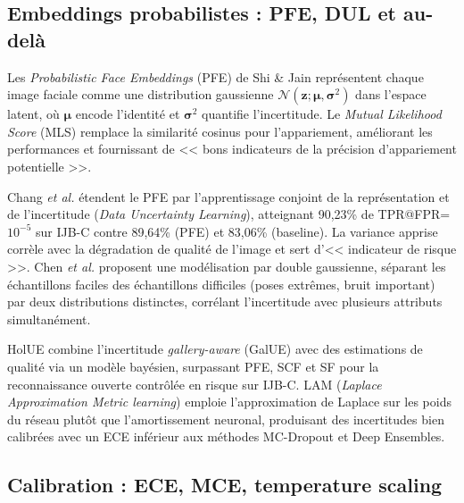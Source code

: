 \documentclass[12pt,a4paper]{report}
\begin{document}
\subsection{Embeddings probabilistes : PFE, DUL et au-del\`{a}}

Les \textit{Probabilistic Face Embeddings} (PFE) de Shi \& Jain \cite{shi2019pfe} repr\'{e}sentent chaque image faciale comme une distribution gaussienne $\mathcal{N}(\mathbf{z}; \boldsymbol{\mu}, \boldsymbol{\sigma}^2)$ dans l'espace latent, o\`{u} $\boldsymbol{\mu}$ encode l'identit\'{e} et $\boldsymbol{\sigma}^2$ quantifie l'incertitude. Le \textit{Mutual Likelihood Score} (MLS) remplace la similarit\'{e} cosinus pour l'appariement, am\'{e}liorant les performances et fournissant de << bons indicateurs de la pr\'{e}cision d'appariement potentielle >>.

Chang \textit{et al.} \cite{chang2020data} \'{e}tendent le PFE par l'apprentissage conjoint de la repr\'{e}sentation et de l'incertitude (\textit{Data Uncertainty Learning}), atteignant 90,23\% de TPR@FPR=$10^{-5}$ sur IJB-C contre 89,64\% (PFE) et 83,06\% (baseline). La variance apprise corr\`{e}le avec la d\'{e}gradation de qualit\'{e} de l'image et sert d'<< indicateur de risque >>. Chen \textit{et al.} \cite{chen2022dual} proposent une mod\'{e}lisation par double gaussienne, s\'{e}parant les \'{e}chantillons faciles des \'{e}chantillons difficiles (poses extr\^{e}mes, bruit important) par deux distributions distinctes, corr\'{e}lant l'incertitude avec plusieurs attributs simultan\'{e}ment.

HolUE \cite{erlygin2024holistic} combine l'incertitude \textit{gallery-aware} (GalUE) avec des estimations de qualit\'{e} via un mod\`{e}le bay\'{e}sien, surpassant PFE, SCF et SF pour la reconnaissance ouverte contr\^{o}l\'{e}e en risque sur IJB-C. LAM (\textit{Laplace Approximation Metric learning}) \cite{brack2023bayesian} emploie l'approximation de Laplace sur les poids du r\'{e}seau plut\^{o}t que l'amortissement neuronal, produisant des incertitudes bien calibr\'{e}es avec un ECE inf\'{e}rieur aux m\'{e}thodes MC-Dropout et Deep Ensembles.

\subsection{Calibration : ECE, MCE, temperature scaling}
\end{document}
